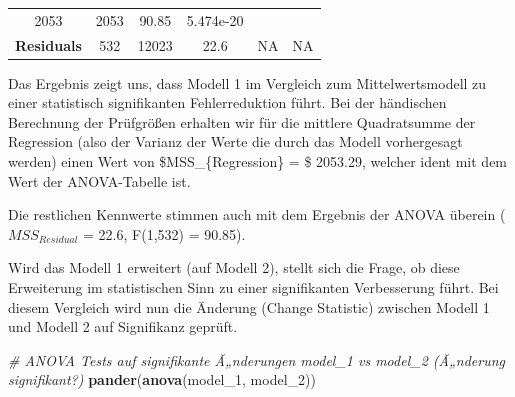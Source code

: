 \documentclass[]{article}
\newenvironment{Shaded}{\begin{snugshade}}{\end{snugshade}}
\newcommand{\KeywordTok}[1]{\textcolor[rgb]{0.13,0.29,0.53}{\textbf{#1}}}
\newcommand{\DecValTok}[1]{\textcolor[rgb]{0.00,0.00,0.81}{#1}}
\newcommand{\CommentTok}[1]{\textcolor[rgb]{0.56,0.35,0.01}{\textit{#1}}}
\newcommand{\NormalTok}[1]{#1}
\begin{document}
\begin{longtable}[]{@{}cccccc@{}}
\begin{minipage}[t]{0.10\columnwidth}
2053\strut
\end{minipage} & \begin{minipage}[t]{0.12\columnwidth}\centering\strut
2053\strut
\end{minipage} & \begin{minipage}[t]{0.12\columnwidth}\centering\strut
90.85\strut
\end{minipage} & \begin{minipage}[t]{0.13\columnwidth}\centering\strut
5.474e-20\strut
\end{minipage}\tabularnewline
\begin{minipage}[t]{0.19\columnwidth}\centering\strut
\textbf{Residuals}\strut
\end{minipage} & \begin{minipage}[t]{0.07\columnwidth}\centering\strut
532\strut
\end{minipage} & \begin{minipage}[t]{0.10\columnwidth}\centering\strut
12023\strut
\end{minipage} & \begin{minipage}[t]{0.12\columnwidth}\centering\strut
22.6\strut
\end{minipage} & \begin{minipage}[t]{0.12\columnwidth}\centering\strut
NA\strut
\end{minipage} & \begin{minipage}[t]{0.13\columnwidth}\centering\strut
NA\strut
\end{minipage}\tabularnewline
\bottomrule
\end{longtable}

Das Ergebnis zeigt uns, dass Modell 1 im Vergleich zum Mittelwertsmodell
zu einer statistisch signifikanten Fehlerreduktion führt. Bei der
händischen Berechnung der Prüfgrößen erhalten wir für die mittlere
Quadratsumme der Regression (also der Varianz der Werte die durch das
Modell vorhergesagt werden) einen Wert von \$MSS\_\{Regression\} = \$
2053.29, welcher ident mit dem Wert der ANOVA-Tabelle ist.

Die restlichen Kennwerte stimmen auch mit dem Ergebnis der ANOVA überein
(\(MSS_{Residual}\) = 22.6, F(1,532) = 90.85).

Wird das Modell 1 erweitert (auf Modell 2), stellt sich die Frage, ob
diese Erweiterung im statistischen Sinn zu einer signifikanten
Verbesserung führt. Bei diesem Vergleich wird nun die Änderung (Change
Statistic) zwischen Modell 1 und Modell 2 auf Signifikanz geprüft.

\begin{Shaded}
\begin{Highlighting}[]
  \CommentTok{# ANOVA Tests auf signifikante Ã„nderungen model_1 vs model_2 (Ã„nderung signifikant?)}
  \KeywordTok{pander}\NormalTok{(}\KeywordTok{anova}\NormalTok{(model_}\DecValTok{1}\NormalTok{, model_}\DecValTok{2}\NormalTok{))}
\end{Highlighting}
\end{Shaded}
\end{document}
